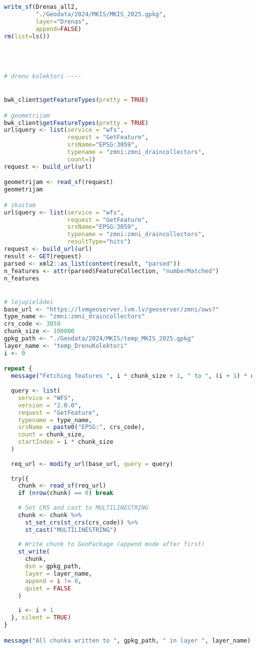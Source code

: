 \documentclass[
]{book}
\begin{document}
\begin{lstlisting}[language=R]
write_sf(Drenas_all2,
         "./Geodata/2024/MKIS/MKIS_2025.gpkg",
         layer="Drenas",
         append=FALSE)
rm(list=ls())




# drenu kolektori ----


bwk_client$getFeatureTypes(pretty = TRUE)

# geometrijam
bwk_client$getFeatureTypes(pretty = TRUE)
url$query <- list(service = "wfs",
                  request = "GetFeature",
                  srsName="EPSG:3059",
                  typename = "zmni:zmni_draincollectors",
                  count=1)
request <- build_url(url)

geometrijam <- read_sf(request)
geometrijam

# skaitam
url$query <- list(service = "wfs",
                  request = "GetFeature",
                  srsName="EPSG:3059",
                  typename = "zmni:zmni_draincollectors",
                  resultType="hits")
request <- build_url(url)
result <- GET(request)
parsed <- xml2::as_list(content(result, "parsed"))
n_features <- attr(parsed$FeatureCollection, "numberMatched")
n_features


# lejupielādei
base_url <- "https://lvmgeoserver.lvm.lv/geoserver/zmni/ows?"
type_name <- "zmni:zmni_draincollectors"
crs_code <- 3059
chunk_size <- 100000
gpkg_path <- "./Geodata/2024/MKIS/temp_MKIS_2025.gpkg"
layer_name <- "temp_DrenuKolektori"
i <- 0

repeat {
  message("Fetching features ", i * chunk_size + 1, " to ", (i + 1) * chunk_size, "...")
  
  query <- list(
    service = "WFS",
    version = "2.0.0",
    request = "GetFeature",
    typename = type_name,
    srsName = paste0("EPSG:", crs_code),
    count = chunk_size,
    startIndex = i * chunk_size
  )
  
  req_url <- modify_url(base_url, query = query)
  
  try({
    chunk <- read_sf(req_url)
    if (nrow(chunk) == 0) break
    
    # Set CRS and cast to MULTILINESTRING
    chunk <- chunk %>%
      st_set_crs(st_crs(crs_code)) %>%
      st_cast("MULTILINESTRING")
    
    # Write chunk to GeoPackage (append mode after first)
    st_write(
      chunk, 
      dsn = gpkg_path,
      layer = layer_name,
      append = i != 0,
      quiet = FALSE
    )
    
    i <- i + 1
  }, silent = TRUE)
}

message("All chunks written to ", gpkg_path, " in layer ", layer_name)


\end{lstlisting}
\end{document}
